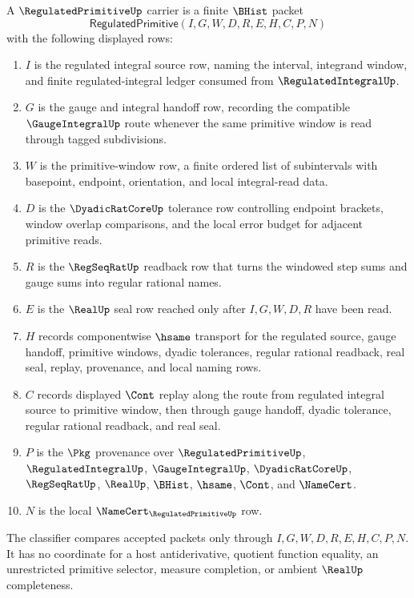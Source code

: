 \begin{definition}
\label{def:regulated-primitive-carrier}
A $\RegulatedPrimitiveUp$ carrier is a finite $\BHist$ packet
$$
\mathsf{RegulatedPrimitive}(I,G,W,D,R,E,H,C,P,N)
$$
with the following displayed rows:
\begin{enumerate}
\item $I$ is the regulated integral source row, naming the interval, integrand window, and finite regulated-integral ledger consumed from $\RegulatedIntegralUp$.
\item $G$ is the gauge and integral handoff row, recording the compatible $\GaugeIntegralUp$ route whenever the same primitive window is read through tagged subdivisions.
\item $W$ is the primitive-window row, a finite ordered list of subintervals with basepoint, endpoint, orientation, and local integral-read data.
\item $D$ is the $\DyadicRatCoreUp$ tolerance row controlling endpoint brackets, window overlap comparisons, and the local error budget for adjacent primitive reads.
\item $R$ is the $\RegSeqRatUp$ readback row that turns the windowed step sums and gauge sums into regular rational names.
\item $E$ is the $\RealUp$ seal row reached only after $I,G,W,D,R$ have been read.
\item $H$ records componentwise $\hsame$ transport for the regulated source, gauge handoff, primitive windows, dyadic tolerances, regular rational readback, real seal, replay, provenance, and local naming rows.
\item $C$ records displayed $\Cont$ replay along the route from regulated integral source to primitive window, then through gauge handoff, dyadic tolerance, regular rational readback, and real seal.
\item $P$ is the $\Pkg$ provenance over $\RegulatedPrimitiveUp$, $\RegulatedIntegralUp$, $\GaugeIntegralUp$, $\DyadicRatCoreUp$, $\RegSeqRatUp$, $\RealUp$, $\BHist$, $\hsame$, $\Cont$, and $\NameCert$.
\item $N$ is the local $\NameCert_{\RegulatedPrimitiveUp}$ row.
\end{enumerate}
The classifier compares accepted packets only through $I,G,W,D,R,E,H,C,P,N$. It has no coordinate for a host antiderivative, quotient function equality, an unrestricted primitive selector, measure completion, or ambient $\RealUp$ completeness.
\end{definition}

